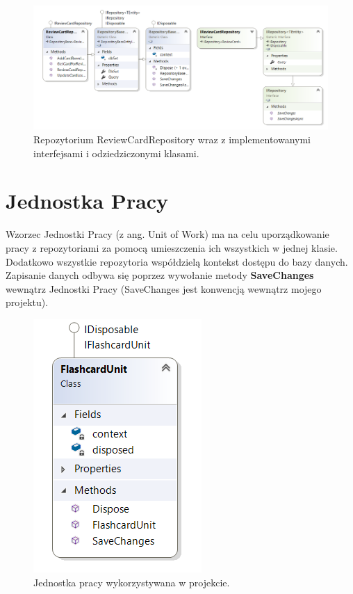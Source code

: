\begin{figure}[h]
	\centering
	\includegraphics[width=\textwidth]{images/ReviewRepository.png}
	 \caption{Repozytorium ReviewCardRepository wraz z implementowanymi interfejsami i odziedziczonymi klasami.}
\end{figure}

\section{Jednostka Pracy\cite{RepositoryUnitOfWorkPattern}}

Wzorzec Jednostki Pracy (z ang. Unit of Work) ma na celu uporządkowanie pracy z repozytoriami za pomocą umieszczenia ich wszystkich w jednej klasie. Dodatkowo wszystkie repozytoria współdzielą kontekst dostępu do bazy danych. Zapisanie danych odbywa się poprzez wywołanie metody \textbf{SaveChanges} wewnątrz Jednostki Pracy (SaveChanges jest konwencją wewnątrz mojego projektu).

\begin{figure}[h]
	\centering
	\includegraphics{images/UnitOfWork.png}
	 \caption{Jednostka pracy wykorzystywana w projekcie.}
\end{figure}

